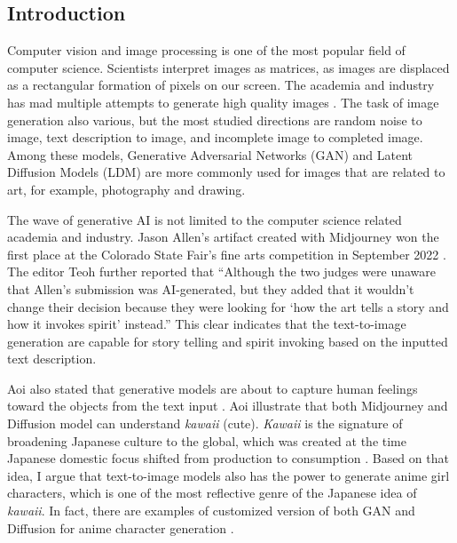 \subsection*{Introduction}
\par
Computer vision and image processing is one of the most popular field of computer science. 
Scientists interpret images as matrices, as images are displaced as a rectangular formation of pixels on our screen.
The academia and industry has mad multiple attempts to generate high quality images
\cite{
    pmlr-v37-gregor15, 
    Qiao_2019_CVPR, 
    NEURIPS2019_1d72310e, 
    NIPS2016_b1301141,
    Goodfellow2020Generative,
    Rombach2022High,
    He_2022_CVPR,
}.
The task of image generation also various,
but the most studied directions are 
random noise to image,
text description to image,
and incomplete image to completed image.
Among these models, Generative Adversarial Networks (GAN) \cite{Goodfellow2020Generative} and Latent Diffusion Models (LDM) \cite{Rombach2022High} are more commonly used for images that are related to art, for example, photography and drawing.

\par
The wave of generative AI is not limited to the computer science related academia and industry. 
Jason Allen's artifact created with Midjourney\cite{Midjourney} won the first place at the Colorado State Fair's fine arts competition in September 2022 \cite{Teoh2022Art}.
The editor Teoh \cites{Teoh2022Art} further reported that 
``Although the two judges were unaware that Allen's submission was AI-generated, but they added that it wouldn't change their decision because they were looking for `how the art tells a story and how it invokes spirit' instead.''
This clear indicates that the text-to-image generation are capable for story telling and spirit invoking based on the inputted text description.

\par
Aoi also stated that generative models are about to capture human feelings toward the objects from the text input \cite{Aoi2022Stable}.
Aoi illustrate that both Midjourney and Diffusion model can understand
{\it kawaii} (cute).
{\it Kawaii} is the signature of broadening Japanese culture to the global,
which was created at the time Japanese domestic focus shifted from production to consumption \cite{Yano2013Pink}.
Based on that idea,
I argue that text-to-image models also has the power to generate anime girl characters,
which is one of the most reflective genre of the Japanese idea of {\it kawaii}.
In fact, there are examples of customized version of both GAN and Diffusion for anime character generation
\cite{
    Jin2017Towards,
    Ruan2022Anime,
    WaifuDiffusion,
    nizan2020council,
    chong2021gans,
    chong2021jojogan,
}.